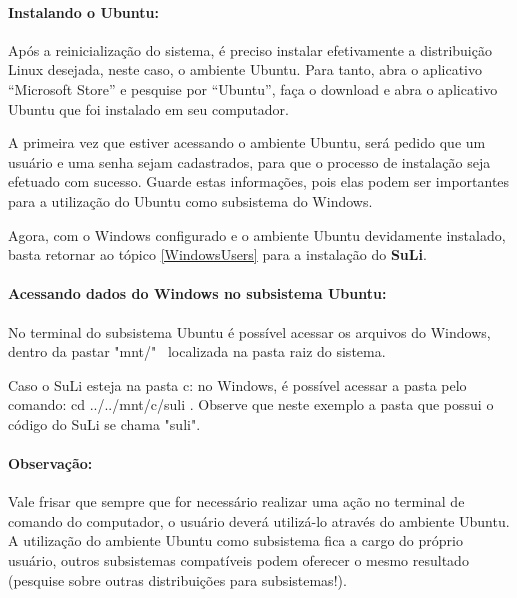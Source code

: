 \documentclass[12pt, a4paper]{article}
\newcommand{\red}{\textcolor{red}}
\newcommand{\SL}{{\bf SuLi}}
\begin{document}

\paragraph{Instalando o Ubuntu:} Após a reinicialização do sistema, é preciso instalar efetivamente a distribuição Linux desejada, neste caso, o ambiente Ubuntu. Para tanto, abra o aplicativo ``Microsoft Store'' e pesquise por ``Ubuntu'', faça o download e abra o aplicativo Ubuntu que foi instalado em seu computador.

A primeira vez que estiver acessando o ambiente Ubuntu, será pedido que um usuário e uma senha sejam cadastrados, para que o processo de instalação seja efetuado com sucesso. Guarde estas informações, pois elas podem ser importantes para a utilização do Ubuntu como subsistema do Windows.

Agora, com o Windows configurado e o ambiente Ubuntu devidamente instalado, basta retornar ao tópico \ref{WindowsUsers} para a instalação do \SL. 

\paragraph{Acessando dados do Windows no subsistema Ubuntu:} No terminal  do subsistema Ubuntu é possível acessar os arquivos do Windows, dentro da pastar "mnt/"~ localizada na pasta raiz do sistema.

Caso o SuLi esteja na pasta c: no Windows, é possível acessar a pasta pelo comando: cd ../../mnt/c/suli . Observe que neste exemplo a pasta que possui o código do SuLi se chama "suli".


\paragraph{Observação:} Vale frisar que sempre que for necessário realizar uma ação no terminal de comando do computador, o usuário deverá utilizá-lo através do ambiente Ubuntu. \\

A utilização do ambiente Ubuntu como subsistema fica a cargo do próprio usuário, outros subsistemas compatíveis podem oferecer o mesmo resultado (pesquise sobre outras distribuições para subsistemas!).


\newpage


\end{document}
